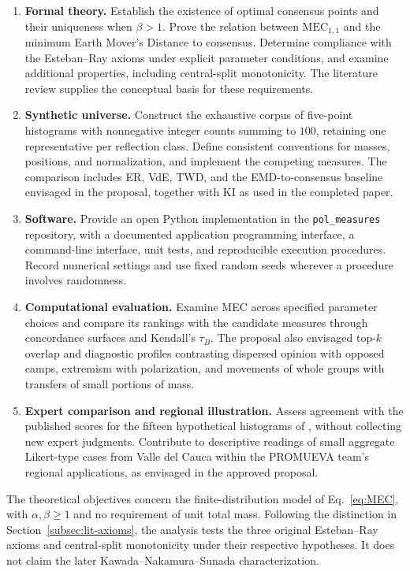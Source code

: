 \documentclass{article}
\theoremstyle{plain}
\theoremstyle{remark}
\begin{document}
\begin{enumerate}\itemsep3pt
  \item \textbf{Formal theory.} Establish the existence of optimal consensus points and their uniqueness when $\beta>1$. Prove the relation between $\mathrm{MEC}_{1,1}$ and the minimum Earth Mover's Distance to consensus. Determine compliance with the Esteban--Ray axioms under explicit parameter conditions, and examine additional properties, including central-split monotonicity. The literature review supplies the conceptual basis for these requirements.
  \item \textbf{Synthetic universe.} Construct the exhaustive corpus of five-point histograms with nonnegative integer counts summing to $100$, retaining one representative per reflection class. Define consistent conventions for masses, positions, and normalization, and implement the competing measures. The comparison includes ER, VdE, TWD, and the EMD-to-consensus baseline envisaged in the proposal, together with KI as used in the completed paper.
  \item \textbf{Software.} Provide an open Python implementation in the \texttt{pol\_measures} repository, with a documented application programming interface, a command-line interface, unit tests, and reproducible execution procedures. Record numerical settings and use fixed random seeds wherever a procedure involves randomness.
  \item \textbf{Computational evaluation.} Examine MEC across specified parameter choices and compare its rankings with the candidate measures through concordance surfaces and Kendall's $\tau_B$. The proposal also envisaged top-$k$ overlap and diagnostic profiles contrasting dispersed opinion with opposed camps, extremism with polarization, and movements of whole groups with transfers of small portions of mass.
  \item \textbf{Expert comparison and regional illustration.} Assess agreement with the published scores for the fifteen hypothetical histograms of \citet{koudenburg2021new}, without collecting new expert judgments. Contribute to descriptive readings of small aggregate Likert-type cases from Valle del Cauca within the PROMUEVA team's regional applications, as envisaged in the approved proposal.
\end{enumerate}

The theoretical objectives concern the finite-distribution model of Eq.~\eqref{eq:MEC}, with $\alpha,\beta\geq1$ and no requirement of unit total mass. Following the distinction in Section~\ref{subsec:lit-axioms}, the analysis tests the three original Esteban--Ray axioms and central-split monotonicity under their respective hypotheses. It does not claim the later Kawada--Nakamura--Sunada characterization.
\end{document}
